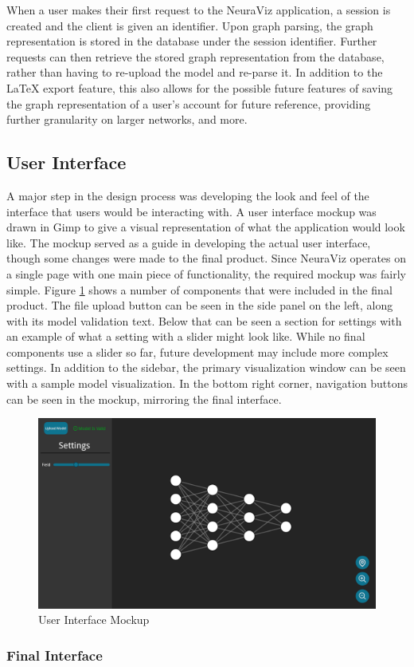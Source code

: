 When a user makes their first request to the NeuraViz application, a session is created and the client is given an identifier. Upon graph parsing, the graph representation is stored in the database under the session identifier. Further requests can then retrieve the stored graph representation from the database, rather than having to re-upload the model and re-parse it. In addition to the LaTeX export feature, this also allows for the possible future features of saving the graph representation of a user's account for future reference, providing further granularity on larger networks, and more.

\subsection{User Interface}
A major step in the design process was developing the look and feel of the interface that users would be interacting with. A user interface mockup was drawn in Gimp to give a visual representation of what the application would look like. The mockup served as a guide in developing the actual user interface, though some changes were made to the final product. Since NeuraViz operates on a single page with one main piece of functionality, the required mockup was fairly simple. Figure \ref{fig:ui_mockup} shows a number of components that were included in the final product. The file upload button can be seen in the side panel on the left, along with its model validation text. Below that can be seen a section for settings with an example of what a setting with a slider might look like. While no final components use a slider so far, future development may include more complex settings. In addition to the sidebar, the primary visualization window can be seen with a sample model visualization. In the bottom right corner, navigation buttons can be seen in the mockup, mirroring the final interface.

\begin{figure}[h]
    \centering
    \includegraphics[width=1\textwidth]{../docs/mockups/Main.png}
    \caption{User Interface Mockup}
    \label{fig:ui_mockup}
\end{figure}

\subsubsection{Final Interface}

